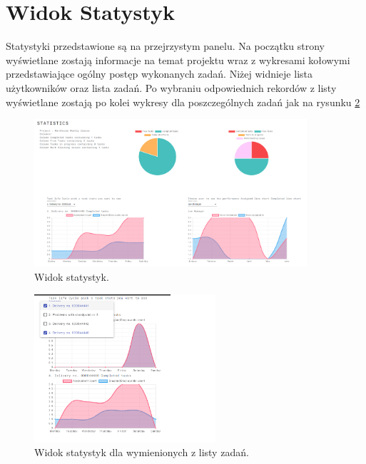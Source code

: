 \section{Widok Statystyk}
Statystyki przedstawione są na przejrzystym panelu. Na początku strony wyświetlane zostają informacje na temat projektu wraz z wykresami kołowymi przedstawiające ogólny postęp wykonanych zadań.
Niżej widnieje lista użytkowników oraz lista zadań. Po wybraniu odpowiednich rekordów z listy wyświetlane zostają po kolei wykresy dla poszczególnych zadań jak na rysunku \ref{scrolledstatistics} 
\begin{figure}[h!]
	\centering
	\includegraphics[width=0.90\textwidth]{statistics}
	
	\caption{Widok statystyk.}
	
	\label{statistics}
\end{figure}

\begin{figure}[h!]
	\centering
	\includegraphics[width=0.60\textwidth]{scrolledstatistics}
	
	\caption{Widok statystyk dla wymienionych z listy zadań.}
	
	\label{scrolledstatistics}
\end{figure}
\clearpage
